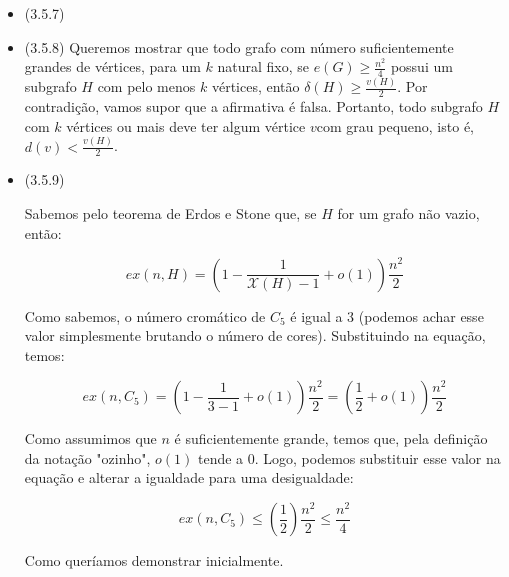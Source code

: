 \documentclass{article}
\begin{document}
\begin{enumerate}
\begin{itemize}
		      \item (3.5.7)
		      \item (3.5.8)
		            Queremos mostrar que todo grafo com número suficientemente grandes de vértices,
		            para um \(k\) natural fixo, se \(e(G) \geq \frac{n^2}{4}\) possui um subgrafo \(H\) com
		            pelo menos \(k\) vértices, então \(\delta(H) \geq \frac{v(H)}{2}\).
		            Por contradição, vamos supor que a afirmativa é falsa. Portanto, todo subgrafo \(H\)
		            com \(k\) vértices ou mais deve ter algum vértice \(v\)com grau pequeno, isto é, \(d(v) < \frac{v(H)}{2}\).

		      \item (3.5.9)

		            Sabemos pelo teorema de Erdos e Stone que, se \(H\) for um grafo não vazio, então:

		            \[ex(n, H) = (1 - \frac{1}{\mathcal{X}(H) - 1} + o(1))\frac{n^2}{2}\]

		            Como sabemos, o número cromático de \(C_5\) é igual a 3 (podemos achar esse valor simplesmente brutando o número de cores). Substituindo na equação, temos:

		            \[ex(n, C_5) = (1 - \frac{1}{3 - 1} + o(1))\frac{n^2}{2} = (\frac{1}{2} + o(1))\frac{n^2}{2}\]

		            Como assumimos que \(n\) é suficientemente grande, temos que, pela definição da notação "ozinho", \(o(1)\) tende a 0. Logo, podemos substituir esse valor na equação e alterar a igualdade para uma desigualdade:

		            \[ex(n, C_5) \leq (\frac{1}{2})\frac{n^2}{2} \leq \frac{n^2}{4}\]

		            Como queríamos demonstrar inicialmente.

	      \end{itemize}
\end{enumerate}
\end{document}
